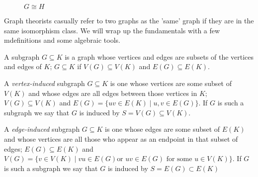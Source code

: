 \begin{figure}[H]
\begin{center}
\end{center}
    \caption{$G\cong H$}
    \label{fig:isomorphismexample}

\end{figure}

Graph theorists casually refer to two graphs as the 'same' graph if they are in the same isomorphism class. We will wrap up the fundamentals with a few mdefinitions and some algebraic tools.

\begin{definition}[Subgraph] A subgraph $G\subseteq K$ is a graph whose vertices and edges are subsets of the vertices and edges of $K$; $G\subseteq K$ if $V(G)\subseteq V(K)$ and $E(G)\subseteq E(K)$.
\end{definition}


\begin{definition} A \textit{vertex-induced} subgraph $G\subseteq K$ is one whose vertices are some subset of $V(K)$ and whose edges are all edges between those vertices in $K$; $V(G)\subseteq V(K)$ and $E(G)=\{uv\in E(K)\mid u,v\in E(G)\}$. If $G$ is such a subgraph we say that $G$ is induced by $S=V(G)\subseteq V(K)$.
\end{definition}

\begin{definition} A \textit{edge-induced} subgraph $G\subseteq K$ is one whose edges are some subset of $E(K)$ and whose vertices are all those who appear as an endpoint in that subset of edges; $E(G)\subseteq E(K)$ and $V(G)=\{v\in V(K)\mid vu\in E(G) \text{or }uv\in E(G)\text{ for some }u\in V(K)\}$. If $G$ is such a subgraph we say that $G$ is induced by $S=E(G)\subset E(K)$
\end{definition}

